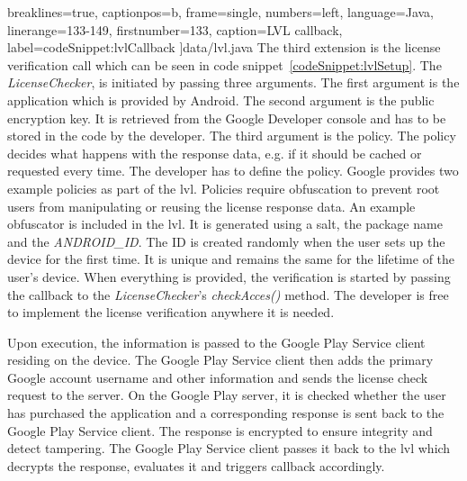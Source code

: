   breaklines=true,
  captionpos=b,
  frame=single,
  numbers=left,
  language=Java,
  linerange={133-149},
  firstnumber=133,
  caption={LVL callback},
  label={codeSnippet:lvlCallback}
]{data/lvl.java}
The third extension is the license verification call which can be seen in code snippet~\ref{codeSnippet:lvlSetup}.
The \textit{LicenseChecker}, is initiated by passing three arguments.
The first argument is the application which is provided by Android.
The second argument is the public encryption key.
It is retrieved from the Google Developer console and has to be stored in the code by the developer.
\newline
The third argument is the policy.
The policy decides what happens with the response data, e.g. if it should be cached or requested every time.
The developer has to define the policy.
Google provides two example policies as part of the \gls{lvl}.
Policies require obfuscation to prevent root users from manipulating or reusing the license response data.
An example obfuscator is included in the \gls{lvl}.
It is generated using a salt, the package name and the \textit{ANDROID\_ID}.
The ID is created randomly when the user sets up the device for the first time.
It is unique and remains the same for the lifetime of the user's device.
\newline
When everything is provided, the verification is started by passing the callback to the \textit{LicenseChecker}'s \textit{checkAcces()} method.
The developer is free to implement the license verification anywhere it is needed.
\cite{developersLicensingOverview} \cite{developersLicensingSetup} \cite{developersLicensingAdding} \cite{digipomLvl}
\newline

Upon execution, the information is passed to the Google Play Service client residing on the device.
The Google Play Service client then adds the primary Google account username and other information and sends the license check request to the server.
On the Google Play server, it is checked whether the user has purchased the application and a corresponding response is sent back to the Google Play Service client.
The response is encrypted to ensure integrity and detect tampering.
The Google Play Service client passes it back to the \gls{lvl} which decrypts the response, evaluates it and triggers callback accordingly. \cite{developersLicensingOverview} \cite{developersLicensingSetup} \cite{developersLicensingAdding} \cite{digipomLvl}
